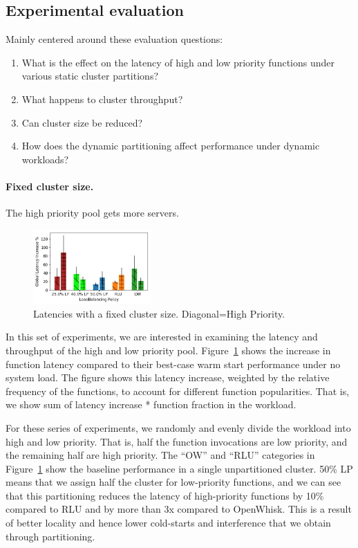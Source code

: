 \subsection{Experimental evaluation}

Mainly centered around these evaluation questions:

\begin{enumerate}
\item What is the effect on the latency of high and low priority functions under various static cluster partitions?
\item What happens to cluster throughput?
\item Can cluster size be reduced? 
\item How does the dynamic partitioning affect performance under dynamic workloads? 
\end{enumerate}




\paragraph{Fixed cluster size.}
The high priority pool gets more servers. 

\begin{figure}
  \centering  \includegraphics[width=0.4\textwidth]{../Figures/fixed/openload-latencies-cntnorm.png}
  \caption{Latencies with a fixed cluster size. Diagonal=High Priority.}
  \label{fig:fixed-lat}
\end{figure}


In this set of experiments, we are interested in examining the latency and throughput of the high and low priority pool.
Figure~\ref{fig:fixed-lat} shows the increase in function latency compared to their best-case warm start performance under no system load. The figure shows this latency increase, weighted by the relative frequency of the functions, to account for different function popularities. That is, we show sum of latency increase * function fraction in the workload.

For these series of experiments, we randomly and evenly divide the workload into high and low priority.
That is, half the function invocations are low priority, and the remaining half are high priority.
The ``OW'' and ``RLU'' categories in Figure~\ref{fig:fixed-lat} show the baseline performance in a single unpartitioned cluster.
50\% LP means that we assign half the cluster for low-priority functions, and we can see that this partitioning reduces the latency of high-priority functions by 10\% compared to RLU and by more than 3x compared to OpenWhisk.
This is a result of better locality and hence lower cold-starts and interference that we obtain through partitioning.

